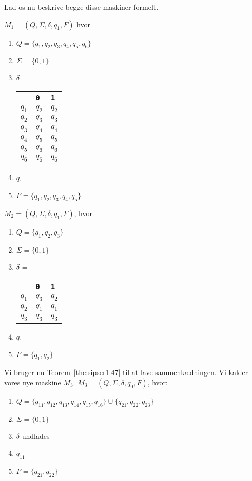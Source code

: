 Lad os nu beskrive begge disse maskiner formelt.

$M_{1} = (Q, \Sigma, \delta, q_{1}, F)$ hvor
\begin{enumerate}
  \item $Q = \{q_{1}, q_{2}, q_{3}, q_{4}, q_{5}, q_{6}\}$
  \item $\Sigma = \{0,1\}$
  \item $\delta$ =
\begin{table}[h]
\centering
\begin{tabular}{l|ll}
      & \texttt{0} & \texttt{1} \\ \hline
$q_1$ & $q_2$      & $q_2$      \\
$q_2$ & $q_3$      & $q_3$      \\
$q_3$ & $q_4$      & $q_4$      \\
$q_4$ & $q_5$      & $q_5$      \\
$q_5$ & $q_6$      & $q_6$      \\
$q_6$ & $q_6$      & $q_6$
\end{tabular}
\end{table}
  \item $q_{1}$
  \item $F = \{q_{1}, q_{2}, q_{3}, q_{4}, q_{5}\}$
\end{enumerate}

$M_{2} = (Q, \Sigma, \delta, q_{1}, F)$, hvor
\begin{enumerate}
  \item $Q = \{q_{1}, q_{2}, q_{3}\}$
  \item $\Sigma = \{0,1\}$
  \item $\delta$ =

\begin{table}[h]
\centering
\begin{tabular}{l|ll}
      & \texttt{0} & \texttt{1} \\ \hline
$q_1$ & $q_3$      & $q_2$      \\
$q_2$ & $q_1$      & $q_1$      \\
$q_3$ & $q_3$      & $q_3$      \\
\end{tabular}
\end{table}

  \item $q_{1}$
  \item $F = \{q_{1}, q_{2}\}$
\end{enumerate}

Vi bruger nu Teorem~\ref{the:sipser1.47} til at lave sammenkædningen. Vi kalder vores nye maskine $M_{3}$. $M_{3} = (Q, \Sigma, \delta, q_{0}, F)$, hvor:
\begin{enumerate}
  \item $Q = \{q_{11}, q_{12}, q_{13}, q_{14}, q_{15}, q_{16}\} \cup \{q_{21}, q_{22}, q_{23}\}$
  \item $\Sigma = \{0,1\}$
  \item $\delta$ undlades
  \item $q_{11}$
  \item $F = \{q_{21}, q_{22}\}$
\end{enumerate}


